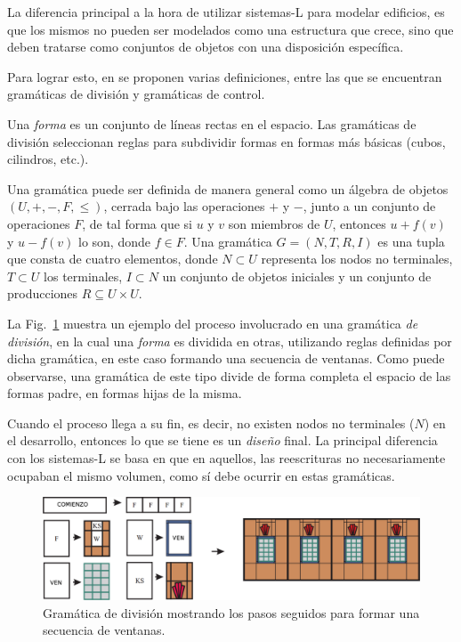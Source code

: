 La diferencia principal a la hora de utilizar sistemas-L para modelar edificios, es que los mismos no pueden ser modelados como una estructura que crece, sino que deben tratarse como conjuntos de objetos con una disposición específica.

Para lograr esto, en \cite{Wonka2003} se proponen varias definiciones, entre las que se encuentran gramáticas de división y gramáticas de control.

Una {\em forma} es un conjunto de líneas rectas en el espacio.
Las gramáticas de división seleccionan reglas para subdividir formas en formas más básicas (cubos, cilindros, etc.).


Una gramática puede ser definida de manera general como un álgebra de objetos $(U,+,-,F,\leq)$, cerrada bajo las operaciones $+$ y $-$, junto a un conjunto de operaciones $F$, de tal forma que si $u$ y $v$ son miembros de $U$, entonces $u+f(v)$ y $u-f(v)$ lo son, donde $f \in F$.
Una gramática $G=(N,T,R,I)$ es una tupla que consta de cuatro elementos, donde $N \subset U$ representa los nodos no terminales, $T \subset U$ los terminales, $I \subset N$ un conjunto de objetos iniciales y un conjunto de producciones $R \subseteq U \times U$.


La Fig.~\ref{fg:splitgrammar} muestra un ejemplo del proceso involucrado en una gramática {\em de división}, en la cual una {\em forma} es dividida en otras, utilizando reglas definidas por dicha gramática, en este caso formando una secuencia de ventanas.
Como puede observarse, una gramática de este tipo divide de forma completa el espacio de las formas padre, en formas hijas de la misma.

Cuando el proceso llega a su fin, es decir, no existen nodos no terminales ($N$) en el desarrollo, entonces lo que se tiene es un {\em diseño} final.
La principal diferencia con los sistemas-L se basa en que en aquellos, las reescrituras no necesariamente ocupaban el mismo volumen, como sí debe ocurrir en estas gramáticas.

\begin{figure}
\center
\includegraphics[width=13cm]{figures/splitgrammar}
\caption[Gramática para formar una secuencia de ventanas]{Gramática de división mostrando los pasos seguidos para formar una secuencia de ventanas.}
\label{fg:splitgrammar}
\end{figure}

